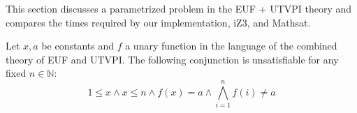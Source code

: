 
This section discusses a parametrized problem 
in the EUF + UTVPI theory and compares the times required by
our implementation, iZ3, and Mathsat.

\begin{lemma} \label{performance_test_lemma_thcomb}
  Let $x, a$ be constants and $f$ a unary function 
  in the language of the combined theory of EUF and UTVPI.
  The following conjunction is unsatisfiable for any
  fixed $n \in \mathbb{N}$:
  \begin{equation*}
    1 \leq x \land x \leq n 
    \land f(x) = a 
    \land \bigwedge_{i=1}^{n} f(i) \neq a
  \end{equation*}
\end{lemma}


